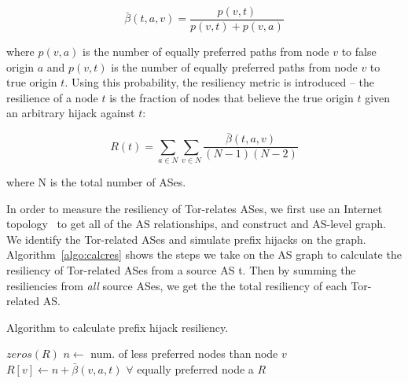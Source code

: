 \begin{equation}
\bar{\beta}(t,a,v) = \frac {p(v,t)} {p(v,t) + p(v,a)}
\end{equation}

where $p(v,a)$ is the number of equally preferred paths from node $v$ to false origin $a$ and $p(v,t)$ is the number of equally preferred paths from node $v$ to true origin $t$.  Using this probability, the resiliency metric is introduced -- the resilience of a node $t$ is the fraction of nodes that believe the true origin $t$ given an arbitrary  hijack against $t$:

\begin{equation}
R(t) = \sum_{a \in N} \sum_{v \in N} \frac {\bar{\beta}(t,a,v)} {(N-1)(N-2)}
\end{equation}

where N is the total number of ASes.

In order to measure the resiliency of Tor-relates ASes, we first use an Internet topology~\cite{caida} to get all of the AS relationships, and construct and AS-level graph.  We identify the Tor-related ASes and simulate prefix hijacks on the graph. Algorithm~\ref{algo:calcres} shows the steps we take on the AS graph to calculate the resiliency of Tor-related ASes from a source AS t. Then by summing the resiliencies from \emph{all} source ASes, we get the the total resiliency of each Tor-related AS.



\begin{algorithm}
\caption{Algorithm to calculate prefix hijack resiliency.}
\label{algo:calcres}
\begin{algorithmic}
    \State {}
    \State $zeros(R)$
		\State $n \gets $ num. of less preferred nodes than node $v$
		\State $R[v] \gets n + \bar{\beta}(v,a,t)$ $\forall$ equally preferred node a
	\EndIf
    \EndFor
    \State \Return $R$
\EndFunction
\end{algorithmic}
\end{algorithm}

